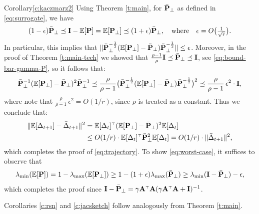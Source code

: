 \documentclass[../../thesis.tex]{subfiles}
\begin{document}
\begin{proofof}{Corollary}{\ref{c:kaczmarz2}}
  Using Theorem \ref{t:main}, for $\bar\P_{\perp}$ as defined in \eqref{eq:surrogate}, we have
  \begin{align*}
    (1-\epsilon)\bar\P_{\perp}\preceq \I-\E[\P] =
    \E[\P_{\perp}]\preceq(1+\epsilon)\bar\P_{\perp},
    \quad\text{where}\quad\epsilon=O\big(\tfrac 1{\sqrt r}\big).
  \end{align*}
  In particular, this implies that
  $\|\bar\P_{\perp}^{-\frac12}(\E[\P_{\perp}]-\bar\P_{\perp})\bar\P_{\perp}^{-\frac12}\|\leq\epsilon$.
  Moreover, in the proof of Theorem \ref{t:main-tech} we showed that
  $\frac{\rho-1}\rho\I\preceq\bar\P_{\perp}\preceq\I$, see
  \eqref{eq:bound-bar-gamma-P}, so it follows that:
  \begin{align*}
    \bar\P_{\perp}^{-1}(\E[\P_{\perp}]-\bar\P_{\perp})^2\bar\P_{\perp}^{-1}\preceq
    \frac{\rho}{\rho-1}\big(\bar\P_{\perp}^{-\frac12}(\E[\P_{\perp}]-\bar\P_{\perp})\bar\P_{\perp}^{-\frac12}\big)^2
    \preceq     \frac{\rho}{\rho-1}\,\epsilon^2\cdot \I,
  \end{align*}
  where note that  $\frac{\rho}{\rho-1}\,\epsilon^2=O(1/r)$, since
  $\rho$ is treated as a constant. Thus we conclude that:
  \begin{align*}
    \|\E[\Delta_{t+1}]-\bar\Delta_{t+1}\|^2
     & =\E[\Delta_t]^\top(\E[\P_{\perp}]-\bar\P_{\perp})^2\E[\Delta_t]
    \\
     & \leq O(1/r)\cdot \E[\Delta_t]^\top\bar\P_{\perp}^2\E[\Delta_t] =
    O(1/r)\cdot \|\bar\Delta_{t+1}\|^2,
  \end{align*}
  which completes the proof of \eqref{eq:trajectory}. To show
  \eqref{eq:worst-case}, it suffices to observe that
  \begin{align*}
    \lambda_{\min}(\E[\P])
    = 1- \lambda_{\max}(\E[\P_{\perp}])
    \geq 1-(1+\epsilon)\lambda_{\max}(\bar\P_{\perp})
    \geq \lambda_{\min}(\I-\bar\P_{\perp}) - \epsilon,
  \end{align*}
  which completes the proof since
  $\I-\bar\P_{\perp}=\gamma\A^\top\A(\gamma\A^\top\A+\I)^{-1}$.
\end{proofof}
Corollaries \ref{c:rsn} and \ref{c:jacsketch} follow analogously from
Theorem \ref{t:main}.
\end{document}
